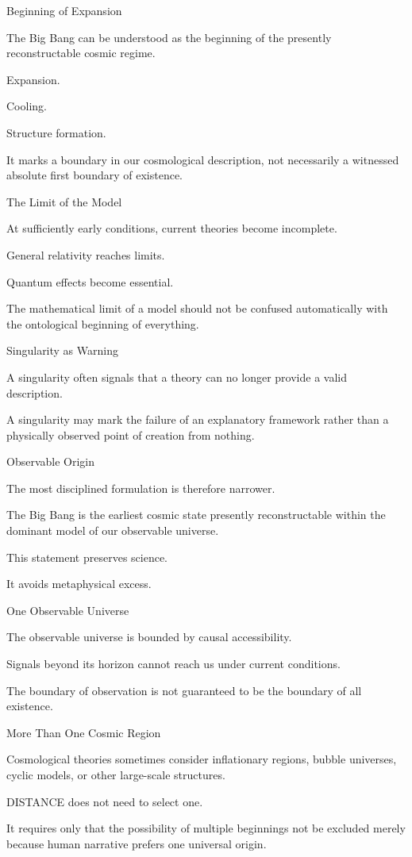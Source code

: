 Beginning of Expansion

The Big Bang can be understood as the beginning of the presently reconstructable cosmic regime.

Expansion.

Cooling.

Structure formation.

It marks a boundary in our cosmological description, not necessarily a witnessed absolute first boundary of existence.

The Limit of the Model

At sufficiently early conditions, current theories become incomplete.

General relativity reaches limits.

Quantum effects become essential.

The mathematical limit of a model should not be confused automatically with the ontological beginning of everything.

Singularity as Warning

A singularity often signals that a theory can no longer provide a valid description.

A singularity may mark the failure of an explanatory framework rather than a physically observed point of creation from nothing.

Observable Origin

The most disciplined formulation is therefore narrower.

The Big Bang is the earliest cosmic state presently reconstructable within the dominant model of our observable universe.

This statement preserves science.

It avoids metaphysical excess.

One Observable Universe

The observable universe is bounded by causal accessibility.

Signals beyond its horizon cannot reach us under current conditions.

The boundary of observation is not guaranteed to be the boundary of all existence.

More Than One Cosmic Region

Cosmological theories sometimes consider inflationary regions, bubble universes, cyclic models, or other large-scale structures.

DISTANCE does not need to select one.

It requires only that the possibility of multiple beginnings not be excluded merely because human narrative prefers one universal origin.

